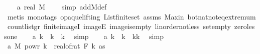 \begin{isabellebody}
\isanewline
\ \ \isamarkupfalse%
\ a{}{\isacharcolon}{\kern0pt}\ {\isachardoublequoteopen}real\ M\ {\isachargreater}{\kern0pt}\ {}{\isachardoublequoteclose}\ \isamarkupfalse%
\ {\isacharparenleft}{\kern0pt}simp\ add{\isacharcolon}{\kern0pt}M{\isacharunderscore}{\kern0pt}def{\isacharparenright}{\kern0pt}\isanewline
\ \ \ \ \isamarkupfalse%
\ {\isacharparenleft}{\kern0pt}metis\ {\isacharparenleft}{\kern0pt}mono{\isacharunderscore}{\kern0pt}tags{\isacharcomma}{\kern0pt}\ opaque{\isacharunderscore}{\kern0pt}lifting{\isacharparenright}{\kern0pt}\ List{\isachardot}{\kern0pt}finite{\isacharunderscore}{\kern0pt}set\ assms{\isacharparenleft}{\kern0pt}{}{\isacharparenright}{\kern0pt}\ Max{\isacharunderscore}{\kern0pt}in\ bot{\isacharunderscore}{\kern0pt}nat{\isacharunderscore}{\kern0pt}{}{\isachardot}{\kern0pt}not{\isacharunderscore}{\kern0pt}eq{\isacharunderscore}{\kern0pt}extremum\ count{\isacharunderscore}{\kern0pt}list{\isacharunderscore}{\kern0pt}gr{\isacharunderscore}{\kern0pt}{}\ finite{\isacharunderscore}{\kern0pt}imageI\ imageE\ image{\isacharunderscore}{\kern0pt}is{\isacharunderscore}{\kern0pt}empty\ linorder{\isacharunderscore}{\kern0pt}not{\isacharunderscore}{\kern0pt}less\ set{\isacharunderscore}{\kern0pt}empty\ zero{\isacharunderscore}{\kern0pt}less{\isacharunderscore}{\kern0pt}one{\isacharparenright}{\kern0pt}\isanewline
\ \ \isamarkupfalse%
\ a{}{\isacharcolon}{\kern0pt}\ {\isachardoublequoteopen}{}{\isacharasterisk}{\kern0pt}k{\isacharminus}{\kern0pt}{}\ {\isacharequal}{\kern0pt}\ {\isacharparenleft}{\kern0pt}k{\isacharminus}{\kern0pt}{}{\isacharparenright}{\kern0pt}\ {\isacharplus}{\kern0pt}\ k{\isachardoublequoteclose}\ \isamarkupfalse%
\ simp\isanewline
\ \ \isamarkupfalse%
\ a{}{\isacharcolon}{\kern0pt}\ {\isachardoublequoteopen}{\isacharparenleft}{\kern0pt}k{\isacharminus}{\kern0pt}{}{\isacharparenright}{\kern0pt}\ {\isacharequal}{\kern0pt}\ k\ {\isacharasterisk}{\kern0pt}\ {\isacharparenleft}{\kern0pt}{\isacharparenleft}{\kern0pt}k{\isacharminus}{\kern0pt}{}{\isacharparenright}{\kern0pt}{\isacharslash}{\kern0pt}k{\isacharparenright}{\kern0pt}{\isachardoublequoteclose}\ \isamarkupfalse%
\ simp\isanewline
\isanewline
\ \ \isamarkupfalse%
\ a{}{\isacharcolon}{\kern0pt}\ {\isachardoublequoteopen}M\ powr\ k\ {\isasymle}\ real{\isacharunderscore}{\kern0pt}of{\isacharunderscore}{\kern0pt}rat\ {\isacharparenleft}{\kern0pt}F\ k\ as{\isacharparenright}{\kern0pt}{\isachardoublequoteclose}\isanewline

\end{isabellebody}
